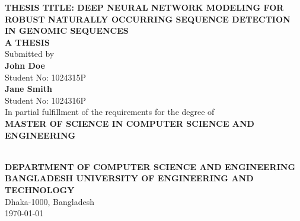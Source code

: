 \begin{titlepage}
\begin{center}
    \vspace*{1.0cm}
    
    {\fontsize{20}{24}\selectfont \bfseries THESIS TITLE: DEEP NEURAL NETWORK MODELING FOR ROBUST NATURALLY OCCURRING SEQUENCE DETECTION IN GENOMIC SEQUENCES}\\[1.5cm]
    
    {\large \bfseries A THESIS}\\[0.3cm]
    {\large Submitted by}\\[0.5cm]
    
    {\fontsize{14}{16}\selectfont \bfseries John Doe}\\[0.2cm]
    {Student No: 1024315P}\\[0.3cm]
    {\fontsize{14}{16}\selectfont \bfseries Jane Smith}\\[0.2cm]
    {Student No: 1024316P}\\[1.5cm]
    
    {\large In partial fulfillment of the requirements for the degree of}\\[0.3cm]
    {\large \bfseries MASTER OF SCIENCE IN COMPUTER SCIENCE AND ENGINEERING}\\[1.5cm]
    
    \\[1.2cm]
    
    {\fontsize{14}{16}\selectfont \bfseries DEPARTMENT OF COMPUTER SCIENCE AND ENGINEERING}\\[0.2cm]
    {\fontsize{14}{16}\selectfont \bfseries BANGLADESH UNIVERSITY OF ENGINEERING AND TECHNOLOGY}\\[0.3cm]
    {\large Dhaka-1000, Bangladesh}\\[1.0cm]
    
    {\large \today}
    
\end{center}
\end{titlepage}
